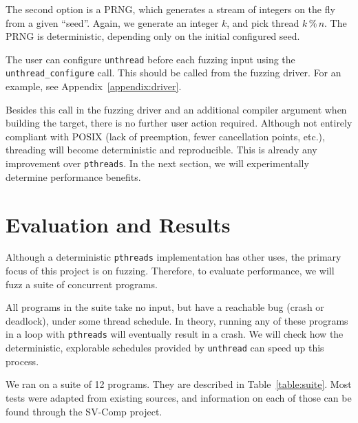 \documentclass{article}
\begin{document}
The second option is a PRNG, which generates a stream of integers on the fly from a given ``seed''. Again, we generate an integer $k$, and pick thread $k\,\%\,n$. The PRNG is deterministic, depending only on the initial configured seed.

\sloppy

The user can configure \texttt{unthread} before each fuzzing input using the \texttt{unthread\_configure} call. This should be called from the fuzzing driver. For an example, see Appendix~\ref{appendix:driver}.

\fussy

Besides this call in the fuzzing driver and an additional compiler argument when building the target, there is no further user action required. Although not entirely compliant with POSIX (lack of preemption, fewer cancellation points, etc.), threading will become deterministic and reproducible. This is already any improvement over \texttt{pthreads}. In the next section, we will experimentally determine performance benefits.

\section{Evaluation and Results}

Although a deterministic \texttt{pthreads} implementation has other uses, the primary focus of this project is on fuzzing. Therefore, to evaluate performance, we will fuzz a suite of concurrent programs.

All programs in the suite take no input, but have a reachable bug (crash or deadlock), under some thread schedule. In theory, running any of these programs in a loop with \texttt{pthreads} will eventually result in a crash. We will check how the deterministic, explorable schedules provided by \texttt{unthread} can speed up this process.

We ran on a suite of 12 programs. They are described in Table~\ref{table:suite}. Most tests were adapted from existing sources, and information on each of those can be found through the SV-Comp project\cite{sv-comp}.
\end{document}
